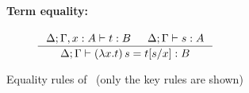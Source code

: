 \begin{figure}
\paragraph{Term equality:} ~~ 
$
 ~~~~
   \inference{\Delta;\Gamma,x:A |- t:B & \Delta;\Gamma |- s:A}
             {\Delta;\Gamma |- (\lambda x.t)\,s=t[s/x] : B} $
\caption{Equality rules of \Fi\ (only the key rules are shown)}
\label{fig:eqFi}
\end{figure}


